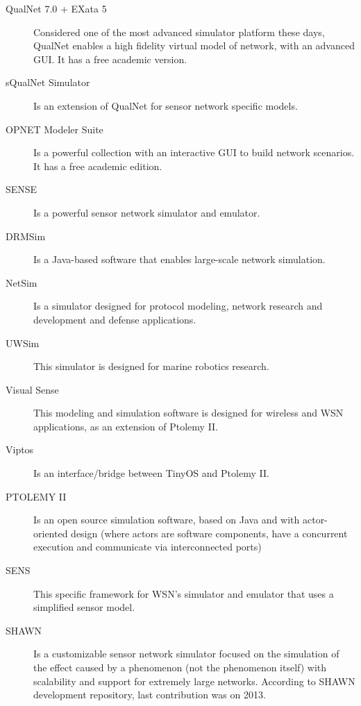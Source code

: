 \begin{description}
	\item [QualNet 7.0 + EXata 5] 
	Considered one of the most advanced simulator platform these days, QualNet enables a high fidelity virtual model of network, with an advanced GUI. It has a free academic version.

	\item [sQualNet Simulator] 
	Is an extension of QualNet for sensor network specific models. 

	\item [OPNET Modeler Suite] 
	Is a powerful collection with an interactive GUI to build network scenarios. It has a free academic edition. 

	\item [SENSE] 
	Is a powerful sensor network simulator and emulator.

	\item [DRMSim] 
	Is a Java-based software that enables large-scale network simulation.

	\item [NetSim] 
	Is a simulator designed for protocol modeling, network research and development and defense applications.

	\item [UWSim] 
	This simulator is designed for marine robotics research.

	\item [Visual Sense] 
	This modeling and simulation software is designed for wireless and WSN applications, as an extension of Ptolemy II.

	\item [Viptos] 
	Is an interface/bridge between TinyOS and Ptolemy II.

	\item [PTOLEMY II] 
	Is an open source simulation software, based on Java and with actor-oriented design (where actors are software components, have a concurrent execution and communicate via interconnected ports)
	
	\item [SENS] 
	This specific framework for WSN's simulator and emulator that uses a simplified sensor model.
	
	\item [SHAWN]	
	Is a customizable sensor network simulator focused on the simulation of the effect caused by a phenomenon (not the phenomenon itself) with scalability and support for extremely large networks. According to SHAWN development repository, last contribution was on 2013.
		

\end{description}
